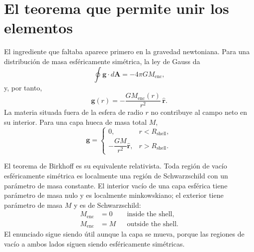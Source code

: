 \section{El teorema que permite unir los elementos}

El ingrediente que faltaba aparece primero en la gravedad newtoniana. Para una distribución de masa esféricamente simétrica, la ley de Gauss da
\begin{equation}
\oint\mathbf g\cdot d\mathbf A=-4\pi G M_{\mathrm{enc}},
\end{equation}
y, por tanto,
\begin{equation}
\mathbf g(r)=-\frac{G M_{\mathrm{enc}}(r)}{r^2}\,\hat{\mathbf r}.
\label{eq:l05-shell-theorem}
\end{equation}
La materia situada fuera de la esfera de radio \(r\) no contribuye al campo neto en su interior. Para una capa hueca de masa total \(M\),
\begin{equation}
\mathbf g=
\begin{cases}
0, & r<R_{\mathrm{shell}},\\[3pt]
-\dfrac{GM}{r^2}\hat{\mathbf r}, & r>R_{\mathrm{shell}}.
\end{cases}
\end{equation}

El teorema de Birkhoff es su equivalente relativista. Toda región de vacío esféricamente simétrica es localmente una región de Schwarzschild con un parámetro de masa constante. El interior vacío de una capa esférica tiene parámetro de masa nulo y es localmente minkowskiano; el exterior tiene parámetro de masa \(M\) y es de Schwarzschild:
\begin{equation}
\begin{aligned}
M_{\mathrm{enc}}&=0 && \text{inside the shell},\\
M_{\mathrm{enc}}&=M && \text{outside the shell}.
\end{aligned}
\label{eq:l05-birkhoff}
\end{equation}
El enunciado sigue siendo útil aunque la capa se mueva, porque las regiones de vacío a ambos lados siguen siendo esféricamente simétricas.


